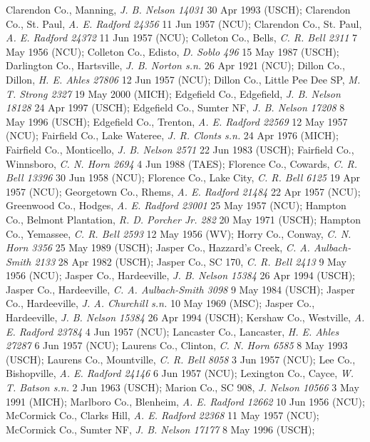 \documentclass{article}
\begin{document}
Clarendon Co., Manning, \textit{J. B. Nelson 14031} 30 Apr 1993 (USCH);
Clarendon Co., St. Paul, \textit{A. E. Radford 24356} 11 Jun 1957 (NCU);
Clarendon Co., St. Paul, \textit{A. E. Radford 24372} 11 Jun 1957 (NCU);
Colleton Co., Bells, \textit{C. R. Bell 2311} 7 May 1956 (NCU);
Colleton Co., Edisto, \textit{D. Soblo 496} 15 May 1987 (USCH);
Darlington Co., Hartsville, \textit{J. B. Norton s.n.} 26 Apr 1921 (NCU);
Dillon Co., Dillon, \textit{H. E. Ahles 27806} 12 Jun 1957 (NCU);
Dillon Co., Little Pee Dee SP, \textit{M. T. Strong 2327} 19 May 2000 (MICH);
Edgefield Co., Edgefield, \textit{J. B. Nelson 18128} 24 Apr 1997 (USCH);
Edgefield Co., Sumter NF, \textit{J. B. Nelson 17208} 8 May 1996 (USCH);
Edgefield Co., Trenton, \textit{A. E. Radford 22569} 12 May 1957 (NCU);
Fairfield Co., Lake Wateree, \textit{J. R. Clonts s.n.} 24 Apr 1976 (MICH);
Fairfield Co., Monticello, \textit{J. B. Nelson 2571} 22 Jun 1983 (USCH);
Fairfield Co., Winnsboro, \textit{C. N. Horn 2694} 4 Jun 1988 (TAES);
Florence Co., Cowards, \textit{C. R. Bell 13396} 30 Jun 1958 (NCU);
Florence Co., Lake City, \textit{C. R. Bell 6125} 19 Apr 1957 (NCU);
Georgetown Co., Rhems, \textit{A. E. Radford 21484} 22 Apr 1957 (NCU);
Greenwood Co., Hodges, \textit{A. E. Radford 23001} 25 May 1957 (NCU);
Hampton Co., Belmont Plantation, \textit{R. D. Porcher Jr. 282} 20 May 1971 (USCH);
Hampton Co., Yemassee, \textit{C. R. Bell 2593} 12 May 1956 (WV);
Horry Co., Conway, \textit{C. N. Horn 3356} 25 May 1989 (USCH);
Jasper Co., Hazzard's Creek, \textit{C. A. Aulbach-Smith 2133} 28 Apr 1982 (USCH);
Jasper Co., SC 170, \textit{C. R. Bell 2413} 9 May 1956 (NCU);
Jasper Co., Hardeeville, \textit{J. B. Nelson 15384} 26 Apr 1994 (USCH);
Jasper Co., Hardeeville, \textit{C. A. Aulbach-Smith 3098} 9 May 1984 (USCH);
Jasper Co., Hardeeville, \textit{J. A. Churchill s.n.} 10 May 1969 (MSC);
Jasper Co., Hardeeville, \textit{J. B. Nelson 15384} 26 Apr 1994 (USCH);
Kershaw Co., Westville, \textit{A. E. Radford 23784} 4 Jun 1957 (NCU);
Lancaster Co., Lancaster, \textit{H. E. Ahles 27287} 6 Jun 1957 (NCU);
Laurens Co., Clinton, \textit{C. N. Horn 6585} 8 May 1993 (USCH);
Laurens Co., Mountville, \textit{C. R. Bell 8058} 3 Jun 1957 (NCU);
Lee Co., Bishopville, \textit{A. E. Radford 24146} 6 Jun 1957 (NCU);
Lexington Co., Cayce, \textit{W. T. Batson s.n.} 2 Jun 1963 (USCH);
Marion Co., SC 908, \textit{J. Nelson 10566} 3 May 1991 (MICH);
Marlboro Co., Blenheim, \textit{A. E. Radford 12662} 10 Jun 1956 (NCU);
McCormick Co., Clarks Hill, \textit{A. E. Radford 22368} 11 May 1957 (NCU);
McCormick Co., Sumter NF, \textit{J. B. Nelson 17177} 8 May 1996 (USCH);
\end{document}
